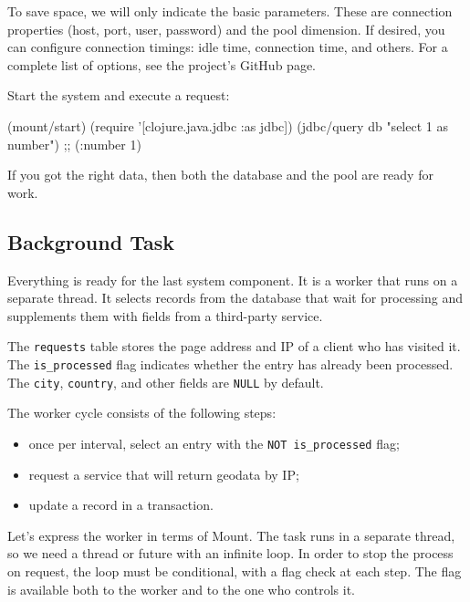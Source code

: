 To save space, we will only indicate the basic parameters. These are connection properties (host, port, user, password) and the pool dimension. If desired, you can configure connection timings: idle time, connection time, and others. For a complete list of options, see the project's GitHub page.

Start the system and execute a request:

\begin{english}
  \begin{clojure}
(mount/start)
(require '[clojure.java.jdbc :as jdbc])
(jdbc/query db "select 1 as number")
;; ({:number 1})
  \end{clojure}
\end{english}

If you got the right data, then both the database and the pool are ready for work.

\subsection{Background Task}

\label{worker}

Everything is ready for the last system component. It is a worker that runs on a separate thread. It selects records from the database that wait for processing and supplements them with fields from a third-party service.

The \verb|requests| table stores the page address and IP of a client who has visited it. The \verb|is_processed| flag indicates whether the entry has already been processed. The \verb|city|, \verb|country|, and other fields are \verb|NULL| by default.


The worker cycle consists of the following steps:

\begin{itemize}

\item
  once per interval, select an entry with the \verb|NOT is_processed| flag;

\item
  request a service that will return geodata by IP;

\item
  update a record in a transaction.

\end{itemize}

Let's express the worker in terms of Mount. The task runs in a separate thread, so we need a thread or future with an infinite loop. In order to stop the process on request, the loop must be conditional, with a flag check at each step. The flag is available both to the worker and to the one who controls it.

